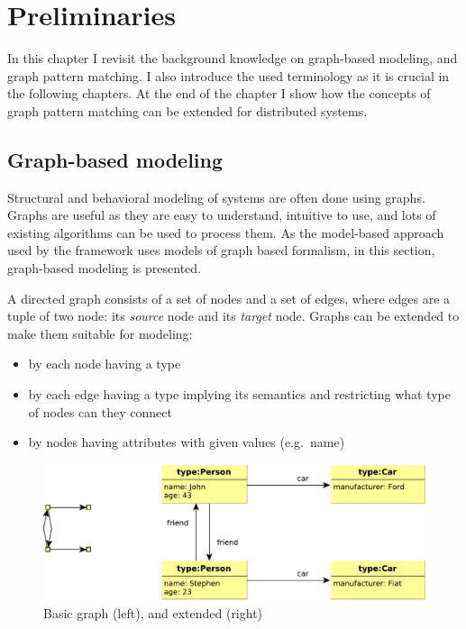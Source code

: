 
\chapter{Preliminaries}

In this chapter I revisit the background knowledge on graph-based modeling, and graph pattern matching. I also introduce the used terminology as it is crucial in the following chapters. At the end of the chapter I show how the concepts of graph pattern matching can be extended for distributed systems.

\section{Graph-based modeling}

Structural and behavioral modeling of systems are often done using graphs. 
Graphs are useful as they are easy to understand, intuitive to use, and lots of existing algorithms can be used to process them. 
As the model-based approach used by the framework uses models of graph based formalism, in this section, graph-based modeling is presented.

A directed graph consists of a set of nodes and a set of edges, where edges are a tuple of two node: its \emph{source} node and its \emph{target} node. 
Graphs can be extended to make them suitable for modeling:

\begin{itemize}
	\item by each node having a type
	\item by each edge having a type implying its semantics and restricting what type of nodes can they connect
	\item by nodes having attributes with given values (e.g.\ name)
\end{itemize}


\begin{figure}[H]
	\begin{center}
		\includegraphics[width=\textwidth]{figures/graphs.pdf}
		\caption{Basic graph (left), and extended (right) }
		\label{fig:graphs}
	\end{center}
\end{figure}

